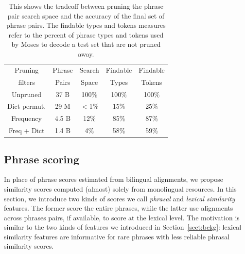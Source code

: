 \documentclass[11pt]{article}
\newcommand{\todo}[1]{\textcolor{red}{TODO: #1}}
\newcommand{\secref}[1]{Section~\ref{#1}}
\begin{document}

\begin{table}
\small
\begin{center}
\label{table:prune}
\begin{tabular}{|c|c|c|c|c|}
\hline
Pruning 	& Phrase	& Search & 	Findable 	& Findable \\
filters	& Pairs	&  Space & Types 	&  Tokens \\
\hline
Unpruned & 37 B & 100\% & 100\% & 100\% \\
Dict permut. & 29 M & $<$1\% & 15\% & 25\% \\
Frequency & 4.5 B & 12\% & 85\% & 87\% \\
Freq + Dict & 1.4 B & 4\% & 58\% & 59\% \\
\hline
\end{tabular}
\caption{This shows the tradeoff between pruning the phrase pair search space and the accuracy of the final set of phrase pairs. The findable types and tokens measures refer to the percent of phrase types and tokens used by Moses to decode a test set that are not pruned away. }\label{pruning-phrase-comparisons}
\end{center}
\end{table}



\subsection{Phrase scoring} \label{sect:score}

In place of phrase scores estimated from bilingual alignments, we propose similarity scores computed (almost) solely from monolingual resources.  In this section, we introduce two kinds of scores we call {\em phrasal} and {\em lexical similarity} features.  The former score the entire phrases, while the latter use alignments across phrases pairs, if available, to score at the lexical level.  The motivation is similar to the two kinds of features we introduced in \secref{sect:bckg}: lexical similarity features are informative for rare phrases with less reliable phrasal similarity scores.
\end{document}
